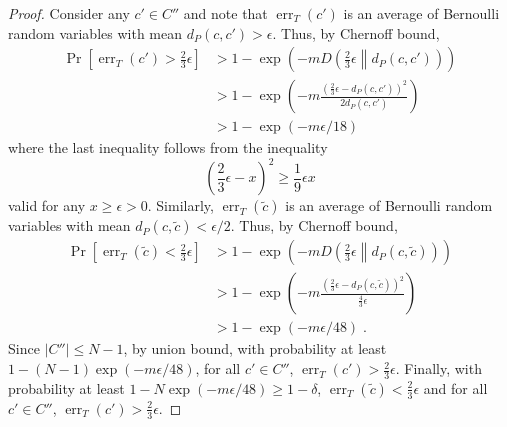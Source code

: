 \documentclass[11pt]{article}
\newcommand{\KL}[2]{D\left(#1 \middle\| #2 \right)}
\DeclareMathOperator{\err}{err}
\begin{document}
\begin{proof}
Consider any $c' \in C''$ and note that $\err_T(c')$ is an average of Bernoulli
random variables with mean $d_P(c,c') > \epsilon$. Thus, by Chernoff bound,
\begin{align*}
\Pr \left[ \err_T(c') > \frac{2}{3} \epsilon \right]
& > 1 - \exp \left( - m \KL{\frac{2}{3} \epsilon}{d_P(c,c')} \right) \\
& > 1 - \exp \left( - m \frac{(\frac{2}{3} \epsilon - d_P(c,c'))^2}{2 d_P(c,c')} \right) \\
& > 1 - \exp \left( - m \epsilon/18 \right)
\end{align*}
where the last inequality follows from the inequality
$$
\left( \frac{2}{3} \epsilon - x \right)^2 \ge \frac{1}{9} \epsilon x
$$
valid for any $x \ge \epsilon > 0$.
Similarly, $\err_T(\widetilde{c})$ is an average of Bernoulli random variables with mean $d_P(c, \widetilde{c}) < \epsilon/2$.
Thus, by Chernoff bound,
\begin{align*}
\Pr \left[ \err_T(\widetilde{c}) < \frac{2}{3} \epsilon \right]
& > 1 - \exp \left( - m \KL{\frac{2}{3} \epsilon}{d_P(c, \widetilde{c})} \right) \\
& > 1 - \exp \left( - m \frac{(\frac{2}{3} \epsilon - d_P(c, \widetilde{c}))^2}{\frac{4}{3} \epsilon} \right) \\
& > 1 - \exp \left( - m \epsilon / 48 \right) \; .
\end{align*}
Since $|C''| \le N - 1$, by union bound, with probability at least $1 - (N - 1)
\exp(-m \epsilon/48)$, for all $c' \in C''$, $\err_T(c') > \frac{2}{3}
\epsilon$. Finally, with probability at least $1 - N \exp(-m \epsilon/48) \ge 1 -
\delta$, $\err_T(\widetilde{c}) < \frac{2}{3}\epsilon$ and for all $c' \in C''$,
$\err_T(c') > \frac{2}{3} \epsilon$.
\end{proof}
\end{document}
